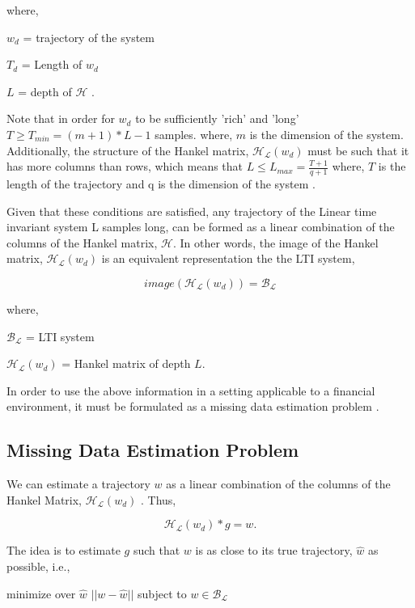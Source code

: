 \noindent where, 

$w_d$ = trajectory of the system

$T_d$ = Length of $w_d$ 

$L$   = depth of $\mathcal{H}$ \cite{markovsky}.  

\noindent Note that in order for $w_d$ to be sufficiently 'rich' and 'long' $T \geq T_{min} = (m+1)*L - 1$ samples. where, $m$ is the dimension of the system. Additionally, the structure of the Hankel matrix, $\mathcal{H_L}(w_d)$ must be such that it has more columns than rows, which means that $L \leq L_{max} = \frac{T+1}{q+1}$ where, $T$ is the length of the trajectory and q is the dimension of the system \cite{markovsky}. 

\noindent Given that these conditions are satisfied, any trajectory of the Linear time invariant system L samples long, can be formed as a linear combination of the columns of the Hankel matrix, $\mathcal{H}$. In other words, the image of the Hankel matrix, $\mathcal{H_L}(w_d)$ is an equivalent representation the the LTI system, 

\begin{equation}
    image(\mathcal{H_L}(w_d)) = \mathcal{B_L}
\end{equation}

\noindent where, 

$\mathcal{B_L}$ = LTI system 

$\mathcal{H_L}(w_d)$ = Hankel matrix of depth $L$. 

\noindent In order to use the above information in a setting applicable to a financial environment, it must be formulated as a missing data estimation problem \cite{markovsky}.

\subsection{Missing Data Estimation Problem}

We can estimate a trajectory $w$ as a linear combination of the columns of the Hankel Matrix, $\mathcal{H_L}(w_d)$ \cite{markovsky}. Thus, 

$$\mathcal{H_L}(w_d)*g = w.$$

\noindent The idea is to estimate $g$ such that $w$ is as close to its true trajectory, $\hat{w}$ as possible, i.e., 

\begin{center}
    minimize  over  $\hat{w}$ $||w-\hat{w}||$ subject to $w\in \mathcal{B_L}$
\end{center}

